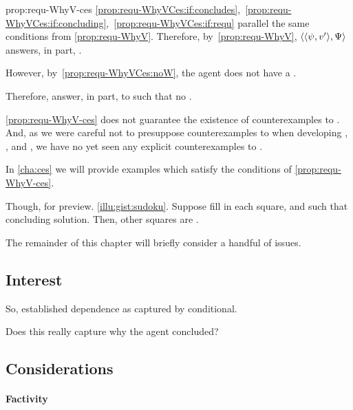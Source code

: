 \begin{note}
  \begin{argument}{prop:requ-WhyV-ces}
    \ref{prop:requ-WhyVCes:if:concludes},~\ref{prop:requ-WhyVCes:if:concluding},~\ref{prop:requ-WhyVCes:if:requ} parallel the same conditions from \autoref{prop:requ-WhyV}.
    Therefore, by~\autoref{prop:requ-WhyV}, \(\langle \langle \psi, v' \rangle, \Psi \rangle\) answers, in part, \qWhyV{}.

    However, by~\ref{prop:requ-WhyVCes:noW}, the agent does not have a \wit{}.

    Therefore, answer, in part, to \qWhyV{} such that no \wit{}.
  \end{argument}

  \autoref{prop:requ-WhyV-ces} does not guarantee the existence of counterexamples to \issueConstraint{}.
  And, as we were careful not to presuppose counterexamples to \issueConstraint{} when developing , , and , we have no yet seen any explicit counterexamples to \issueConstraint{}.

  In \autoref{cha:ces} we will provide examples which satisfy the conditions of \autoref{prop:requ-WhyV-ces}.
\end{note}

\begin{note}
  Though, for preview.
  \autoref{illu:gist:sudoku}.
  Suppose fill in each square, and such that concluding solution.
  Then, other squares are .
\end{note}


\begin{note}
  The remainder of this chapter will briefly consider a handful of issues.
\end{note}


\subsection{Interest}
\label{sec:interest}

\begin{note}
  So, established dependence as captured by conditional.

  Does this really capture why the agent concluded?
\end{note}


\subsection{Considerations}
\label{sec:objection}


\paragraph{Factivity}

